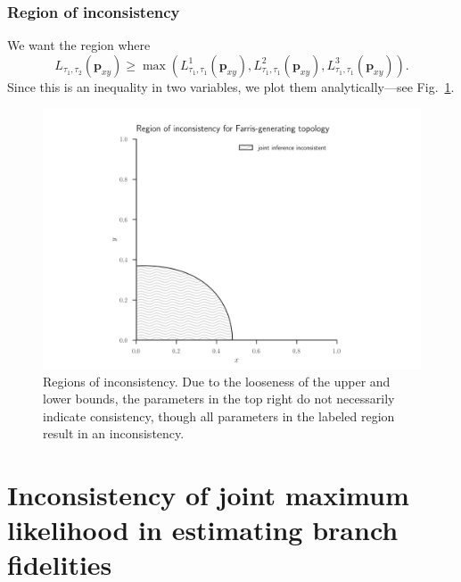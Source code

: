 \documentclass{article}
\begin{document}
\subsubsection{Region of inconsistency}

We want the region where
$$
L_{\tau_1,\tau_2}(\mathbf{p}_{xy}) \ge \max(L^{1}_{\tau_1,\tau_1}(\mathbf{p}_{xy}), L^{2}_{\tau_1,\tau_1}(\mathbf{p}_{xy}),L^{3}_{\tau_1,\tau_1}(\mathbf{p}_{xy})).
$$
Since this is an inequality in two variables, we plot them analytically---see Fig.~\ref{fig:inconsistency-farris}.

\begin{figure}
\centering
\includegraphics[width=.9\textwidth]{topology-inconsistency-inkscape}
\caption{
    Regions of inconsistency.
    Due to the looseness of the upper and lower bounds, the parameters in the top right do not necessarily indicate consistency, though all parameters in the labeled region result in an inconsistency.
}
\label{fig:inconsistency-farris}
\end{figure}

\section{Inconsistency of joint maximum likelihood in estimating branch fidelities}
\end{document}
